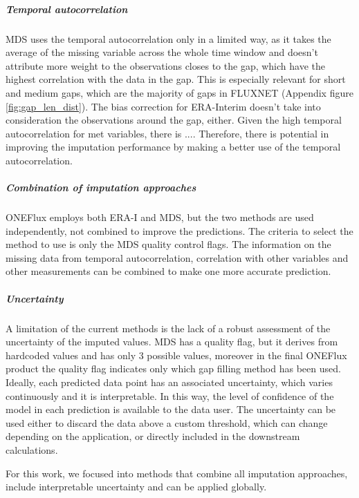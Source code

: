 \documentclass{article}
\let\Oldsubsection\subsection
\renewcommand{\subsection}{\FloatBarrier\Oldsubsection}
\begin{document}
\subparagraph{Temporal autocorrelation} MDS uses the temporal autocorrelation only in a limited way, as it takes the average of the missing variable across the whole time window and doesn't attribute more weight to the observations closes to the gap, which have the highest correlation with the data in the gap. This is especially relevant for short and medium gaps, which are the majority of gaps in FLUXNET (Appendix figure \ref{fig:gap_len_dist}). The bias correction for ERA-Interim doesn't take into consideration the observations around the gap, either.  Given the high temporal autocorrelation for met variables, there is .... Therefore, there is potential in improving the imputation performance by making a better use of the temporal autocorrelation.

\subparagraph{Combination of imputation approaches} ONEFlux employs both ERA-I and MDS, but the two methods are used independently, not combined to improve the predictions. The criteria to select the method to use is only the MDS quality control flags. The information on the missing data from temporal autocorrelation, correlation with other variables and other measurements can be combined to make one more accurate prediction.

\subparagraph{Uncertainty} A limitation of the current methods is the lack of a robust assessment of the uncertainty of the imputed values. MDS has a quality flag, but it derives from hardcoded values and has only 3 possible values, moreover in the final ONEFlux product the quality flag indicates only which gap filling method has been used. Ideally, each predicted data point has an associated uncertainty, which varies continuously and it is interpretable. In this way, the level of confidence of the model in each prediction is available to the data user. The uncertainty can be used either to discard the data above a custom threshold, which can change depending on the application, or directly included in the downstream calculations.

For this work, we focused into methods that combine all imputation approaches, include interpretable uncertainty and can be applied globally. 


\end{document}
